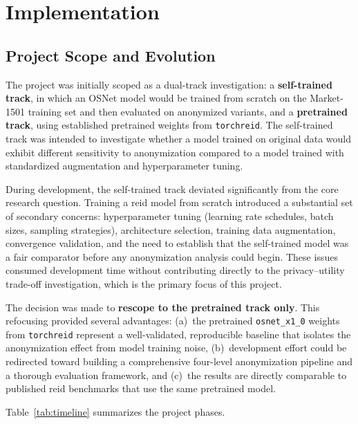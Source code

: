 \chapter{Implementation}

\section{Project Scope and Evolution}

The project was initially scoped as a dual-track investigation: a \textbf{self-trained track}, in which an OSNet model would be trained from scratch on the Market-1501 training set and then evaluated on anonymized variants, and a \textbf{pretrained track}, using established pretrained weights from \texttt{torchreid}. The self-trained track was intended to investigate whether a model trained on original data would exhibit different sensitivity to anonymization compared to a model trained with standardized augmentation and hyperparameter tuning.

During development, the self-trained track deviated significantly from the core research question. Training a \acrshort{reid} model from scratch introduced a substantial set of secondary concerns: hyperparameter tuning (learning rate schedules, batch sizes, sampling strategies), architecture selection, training data augmentation, convergence validation, and the need to establish that the self-trained model was a fair comparator before any anonymization analysis could begin. These issues consumed development time without contributing directly to the privacy--utility trade-off investigation, which is the primary focus of this project.

The decision was made to \textbf{rescope to the pretrained track only}. This refocusing provided several advantages: (a)~the pretrained \texttt{osnet\_x1\_0} weights from \texttt{torchreid} represent a well-validated, reproducible baseline that isolates the anonymization effect from model training noise, (b)~development effort could be redirected toward building a comprehensive four-level anonymization pipeline and a thorough evaluation framework, and (c)~the results are directly comparable to published \acrshort{reid} benchmarks that use the same pretrained model.

Table~\ref{tab:timeline} summarizes the project phases.

